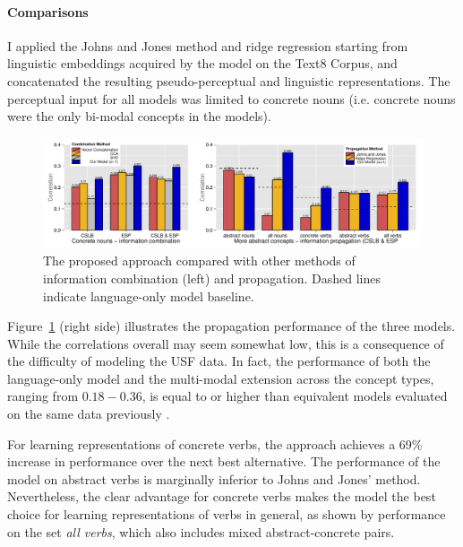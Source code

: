 \paragraph{Comparisons} I applied the Johns and Jones method and ridge regression starting from linguistic embeddings acquired by the \cite{mikolov2013efficient} model on the Text8 Corpus, and concatenated the resulting pseudo-perceptual and linguistic representations. The perceptual input for all models was limited to concrete nouns (i.e. concrete nouns were the only bi-modal concepts in the models).

 \begin{figure}  \includegraphics[width = \textwidth]{Chapter_3/Graph_1_EMNLP2014}  \caption{\label{main_results} The proposed approach compared with other methods of information combination (left) and propagation. Dashed lines indicate language-only model baseline.}\end{figure}

Figure~\ref{main_results} (right side) illustrates the propagation performance of the three models. While the correlations overall may seem somewhat low, this is a consequence of the difficulty of modeling the USF data. In fact, the performance of both the language-only model and the multi-modal extension across the concept types, ranging from \(0.18 - 0.36\), is equal to or higher than equivalent models evaluated on the same data previously \citep{feng2010visual,silberer2012grounded,silberer2013models}. 

For learning representations of concrete verbs, the approach achieves a 69\% increase in performance over the next best alternative. The performance of the model on abstract verbs is marginally inferior to Johns and Jones' method. Nevertheless, the clear advantage for concrete verbs makes the model the best choice for learning representations of verbs in general, as shown by performance on the set \emph{all verbs}, which also includes mixed abstract-concrete pairs. 

